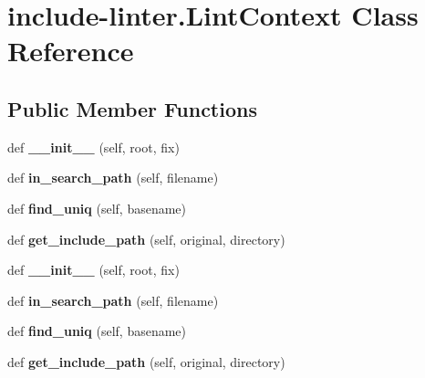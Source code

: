 \hypertarget{classinclude-linter_1_1LintContext}{}\section{include-\/linter.Lint\+Context Class Reference}
\label{classinclude-linter_1_1LintContext}
\subsection*{Public Member Functions}
\begin{DoxyCompactItemize}
\item 
\mbox{\label{classinclude-linter_1_1LintContext_ab74ae37d08f1a1fb2d2c87734374e4f5}} 
def {\bfseries \+\_\+\+\_\+init\+\_\+\+\_\+} (self, root, fix)
\item 
\mbox{\label{classinclude-linter_1_1LintContext_a1172788272a004489cc74eaf68e88512}} 
def {\bfseries in\+\_\+search\+\_\+path} (self, filename)
\item 
\mbox{\label{classinclude-linter_1_1LintContext_a515cb01e112528f2243e52490a291df3}} 
def {\bfseries find\+\_\+uniq} (self, basename)
\item 
\mbox{\label{classinclude-linter_1_1LintContext_a6f0238e1a92ad652a4517231f026907e}} 
def {\bfseries get\+\_\+include\+\_\+path} (self, original, directory)
\item 
\mbox{\label{classinclude-linter_1_1LintContext_ab74ae37d08f1a1fb2d2c87734374e4f5}} 
def {\bfseries \+\_\+\+\_\+init\+\_\+\+\_\+} (self, root, fix)
\item 
\mbox{\label{classinclude-linter_1_1LintContext_a1172788272a004489cc74eaf68e88512}} 
def {\bfseries in\+\_\+search\+\_\+path} (self, filename)
\item 
\mbox{\label{classinclude-linter_1_1LintContext_a515cb01e112528f2243e52490a291df3}} 
def {\bfseries find\+\_\+uniq} (self, basename)
\item 
\mbox{\label{classinclude-linter_1_1LintContext_a6f0238e1a92ad652a4517231f026907e}} 
def {\bfseries get\+\_\+include\+\_\+path} (self, original, directory)
\end{DoxyCompactItemize}
